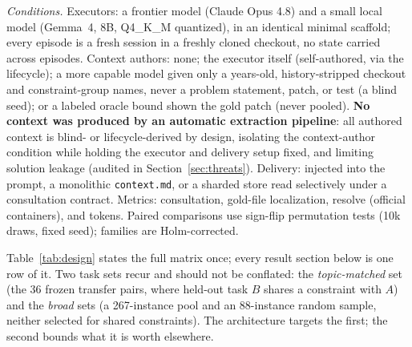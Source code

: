 \documentclass[sigconf,screen]{acmart}
\newcommand{\ctx}{\texttt{context.md}}
\begin{document}
\emph{Conditions.} Executors: a frontier model (Claude Opus 4.8) and a small local
model (Gemma~4, 8B, Q4\_K\_M quantized), in an identical minimal scaffold; every episode is
a fresh session in a freshly cloned checkout, no state carried across episodes.
Context authors: none; the executor itself (self-authored, via the lifecycle); a
more capable model given only a years-old, history-stripped checkout and
constraint-group names, never a problem statement, patch, or test (a blind seed);
or a labeled oracle bound shown the gold patch (never pooled). \textbf{No context
was produced by an automatic extraction pipeline}: all authored context is blind-
or lifecycle-derived by design, isolating the context-author condition while
holding the executor and delivery setup fixed, and limiting solution leakage
(audited in Section~\ref{sec:threats}). Delivery: injected into
the prompt, a monolithic \ctx{}, or a sharded store read selectively under a
consultation contract. Metrics: consultation, gold-file localization, resolve
(official containers), and tokens. Paired comparisons use sign-flip permutation
tests (10k draws, fixed seed); families are Holm-corrected.

Table~\ref{tab:design} states the full matrix once; every result section below is
one row of it. Two task sets recur and should not be conflated: the
\emph{topic-matched} set (the 36 frozen transfer pairs, where held-out task $B$
shares a constraint with $A$) and the \emph{broad} sets (a 267-instance pool and
an 88-instance random sample, neither selected for shared constraints). The
architecture targets the first; the second bounds what it is worth elsewhere.
\end{document}

